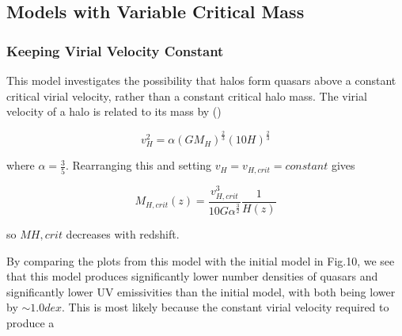 \documentclass[12pt, twocolumn]{report}%
\begin{document}
\subsection{Models with Variable Critical Mass}
\subsubsection{Keeping Virial Velocity Constant}

This model investigates the possibility that halos form quasars above a constant critical virial velocity, rather than a constant critical halo mass. The virial velocity of a halo is related to its mass by (\cite{Ikea})

\begin{equation}
    v_H^2=\alpha(GM_H)^{\frac{2}{3}}(10H)^{\frac{2}{3}}
\end{equation}

\noindent where $\alpha=\frac{3}{5}$. Rearranging this and setting $v_H=v_{H,crit}=constant$ gives

\begin{equation}
    M_{H,crit}(z)=\frac{v_{H,crit}^3}{10G\alpha^{\frac{3}{2}}}\frac{1}{H(z)}
\end{equation}

\noindent so $M{H,crit}$ decreases with redshift.\par

By comparing the plots from this model with the initial model in Fig.10, we see that this model produces significantly lower number densities of quasars and significantly lower UV emissivities than the initial model, with both being lower by $\sim1.0dex$. This is most likely because the constant virial velocity required to produce a

\onecolumngrid
\end{document}
